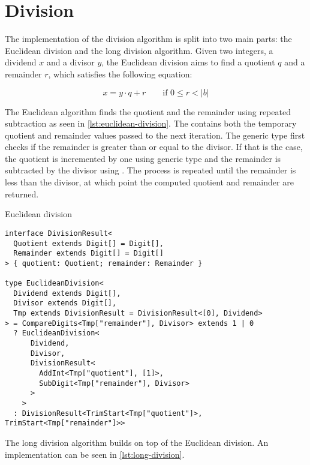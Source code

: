 \section{Division}

The implementation of the division algorithm is split into two main parts: the Euclidean division and the long division algorithm. Given two integers, a dividend $x$ and a divisor $y$, the Euclidean division aims to find a quotient $q$ and a remainder $r$, which satisfies the following equation:

$$x = y\cdot q + r \qquad \text{if } 0 \le r < |b|$$

The Euclidean algorithm finds the quotient and the remainder using repeated subtraction as seen in \ref{lst:euclidean-division}. The  contains both the temporary quotient and remainder values passed to the next iteration. The  generic type first checks if the remainder is greater than or equal to the divisor. If that is the case, the quotient is incremented by one using  generic type and the remainder is subtracted by the divisor using . The process is repeated until the remainder is less than the divisor, at which point the computed quotient and remainder are returned.

\begin{listing}[ht]
\caption{Euclidean division}\label{lst:euclidean-division}
\begin{verbatim}
interface DivisionResult<
  Quotient extends Digit[] = Digit[],
  Remainder extends Digit[] = Digit[]
> { quotient: Quotient; remainder: Remainder }

type EuclideanDivision<
  Dividend extends Digit[],
  Divisor extends Digit[],
  Tmp extends DivisionResult = DivisionResult<[0], Dividend>
> = CompareDigits<Tmp["remainder"], Divisor> extends 1 | 0
  ? EuclideanDivision<
      Dividend,
      Divisor,
      DivisionResult<
        AddInt<Tmp["quotient"], [1]>,
        SubDigit<Tmp["remainder"], Divisor>
      >
    >
  : DivisionResult<TrimStart<Tmp["quotient"]>, TrimStart<Tmp["remainder"]>>
\end{verbatim}
\end{listing}

The long division algorithm builds on top of the Euclidean division. An implementation can be seen in \ref{lst:long-division}.


